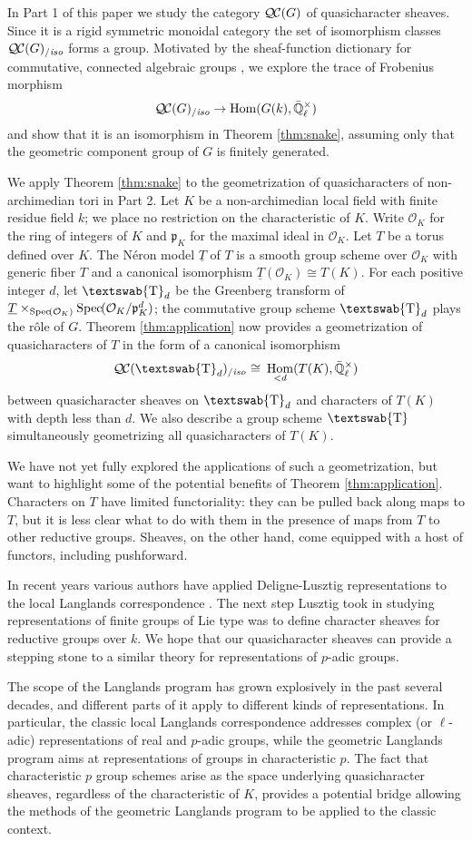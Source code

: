 \documentclass[11pt]{amsart}
\newcommand{\mathswab}[1]{\operatorname{\textswab{#1}}}
\theoremstyle{plain}
\theoremstyle{definition}
\theoremstyle{remark}
\newcommand{\Spec}[1]{{\operatorname{Spec}\hskip-1pt( #1 )}}
\newcommand{\EE}{\mathbb{\bar Q}_\ell}
\newcommand{\OK}{\mathcal{O}_K}
\newcommand{\pK}{\mathfrak{p}_K}
\newcommand{\Fq}{k}
\newcommand{\EEx}{\EE^\times}
\DeclareMathOperator{\Hom}{Hom}
\newcommand{\iso}{{\ \cong\ }}
\newcommand{\GN}[1]{\mathswab{#1}}
\newcommand{\TT}{\underline{T}}
\newcommand{\QC}{{\mathcal{Q\hskip-0.8pt C}}}
\newcommand{\QCiso}[1]{\QC(#1)_{/\textit{iso}}}
\begin{document}
In Part 1 of this paper we study the category $\QC(G)$ of quasicharacter sheaves.
Since it is a rigid symmetric monoidal category
the set of isomorphism classes $\QCiso{G}$ forms a group.
Motivated by the sheaf-function dictionary for commutative, connected
algebraic groups \cite{SGA4.5}, we explore the trace of Frobenius morphism
\[
\QCiso{G} \to \Hom(G(\Fq), \EEx)
\]
and show that it is an isomorphism in Theorem \ref{thm:snake}, assuming only
that the geometric component group of $G$ is finitely generated.

We apply Theorem \ref{thm:snake} to the geometrization of quasicharacters
of non-archimedian tori in Part 2.  Let $K$ be a non-archimedian local field
with finite residue field $\Fq$; we place no restriction on the characteristic of $K$.
Write $\OK$ for the ring of integers of $K$ and $\pK$ for the maximal ideal in $\OK$.
Let $T$ be a torus defined over $K$.  The N\'eron model $\TT$ of $T$
is a smooth group scheme over $\OK$ with generic fiber $T$ and a canonical isomorphism
$\TT(\OK) \cong T(K)$.  For each positive integer $d$, let $\GN{T}_d$ be the
Greenberg transform of $\TT \times_{\Spec{\OK}} \Spec{\OK/\pK^d}$; the commutative
group scheme $\GN{T}_d$ plays the r\^{o}le of $G$.  Theorem \ref{thm:application}
now provides a geometrization of quasicharacters of $T$ in the form of a canonical isomorphism
\[
\QCiso{\GN{T}_d} 
\iso
\Hom_{< d}(T(K),\EEx)
\] 
between quasicharacter sheaves on $\GN{T}_d$ and characters of $T(K)$ with depth less than $d$.
We also describe a group scheme $\GN{T}$ simultaneously geometrizing all quasicharacters of $T(K)$.

We have not yet fully explored the applications of such a geometrization, but want to highlight
some of the potential benefits of Theorem \ref{thm:application}.  Characters on $T$ have limited
functoriality: they can be pulled back along maps to $T$, but it is less clear what to do with them
in the presence of maps from $T$ to other reductive groups.  Sheaves, on the other hand, come
equipped with a host of functors, including pushforward.  

In recent years various authors have applied Deligne-Lusztig representations to the
local Langlands correspondence \cite{}.  The next step Lusztig took in studying representations
of finite groups of Lie type was to define character sheaves for reductive groups over $\Fq$.
We hope that our quasicharacter sheaves can provide a stepping stone to a similar theory for
representations of $p$-adic groups.

The scope of the Langlands program has grown explosively in the past several decades, and
different parts of it apply to different kinds of representations.  In particular, the classic local Langlands
correspondence addresses complex (or $\ell$-adic) representations of real and $p$-adic groups, while
the geometric Langlands program aims at representations of groups in characteristic $p$.  The fact that
characteristic $p$ group schemes arise as the space underlying quasicharacter sheaves, regardless of
the characteristic of $K$, provides a potential bridge allowing the methods of the geometric Langlands
program to be applied to the classic context.
\end{document}
